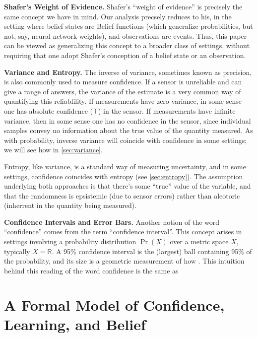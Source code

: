 {	\textbf{Shafer's Weight of Evidence.}
	Shafer's ``weight of evidence'' is precisely the same concept we have in mind.
	Our analysis precsely reduces to his, in the setting where belief states are Belief functions (which generalize probabilities, but not, say, neural network weights), and observations are events.
	Thus, this paper can be viewed as generalizing this concept to a broader class of settings, without requiring that one adopt Shafer's conception of a belief state or an observation.


	\textbf{Variance and Entropy.}
	The inverse of variance, sometimes known as precision,
		is also commonly used to measure confidence.
	If a sensor is unreliable and can give a range of answers, the variance of the estimate is a very common way of quantifying this reliablility.
	If measurements have zero variance, in some sense one has absolute confidence ($\top$) in the sensor. If measurements have infinite variance, then in some sense one has no confidence in the sensor, since individual samples convey no information about the true value of the quantity measured.
	As with probability, inverse variance will coincide with confidence in some settings; we will see how in \cref{sec:variance}.

	Entropy, like variance, is a standard way of measuring uncertainty, and in some settings, confidence coincides with entropy (see \cref{sec:entropy}).
	The assumption underlying both approaches is that there's some ``true'' value of the variable, and that the randomness is epsistemic (due to sensor errors) rather than aleotoric (inherrent in the quantity being measured).

	\textbf{Confidence Intervals and Error Bars.}
	Another notion of the word ``confidence'' comes from the term ``confidence interval''.
	This concept arises in settings involving a probability distribution $\Pr(X)$ over a metric space $X$, typically $X = \mathbb R$.
	A 95\% confidence interval is the (largest) ball containing 95\% of the probability, and its size is a geometric measurement of how .
	This intuition behind this reading of the word confidence is the same as
}






\section{A Formal Model of Confidence, Learning, and Belief}

